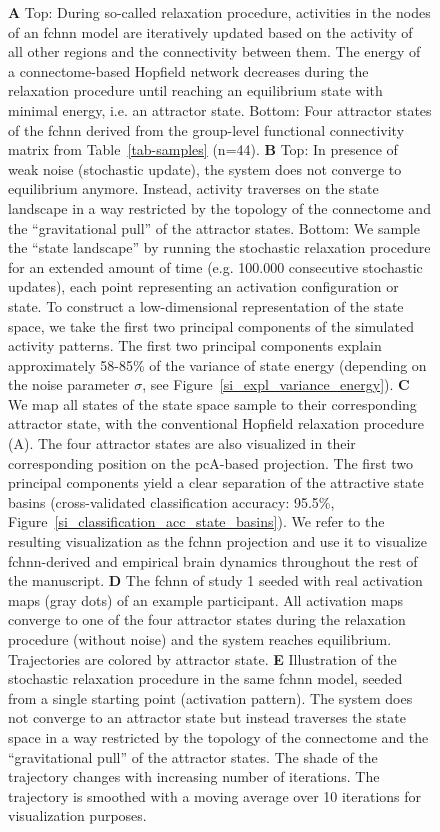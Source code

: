 \documentclass{article}
\begin{document}
\begin{figure}[!htbp]
{\textbf{A} Top: During so-called relaxation procedure, activities in the nodes of an \acrshort{fchnn} model are iteratively updated based on the activity of all other regions and the connectivity between them. The energy of a
connectome-based Hopfield network decreases during the relaxation procedure until reaching an equilibrium state with
minimal energy, i.e. an attractor state. Bottom: Four attractor states of the \acrshort{fchnn} derived from the
group-level functional connectivity matrix from Table~\ref{tab-samples} (n=44).
\textbf{B} Top: In presence of weak noise (stochastic update), the system
does not converge to equilibrium anymore. Instead, activity traverses on the state landscape in a way
restricted by the topology of the connectome and the ``gravitational pull'' of the attractor states. Bottom: We sample
the ``state landscape'' by running the stochastic relaxation procedure for an extended amount of time (e.g. 100.000 consecutive
stochastic updates), each point representing an activation configuration or state. To construct a
low-dimensional representation of the state space, we take the first two principal components of the simulated activity
patterns. The first two principal components explain approximately 58-85\% of the variance of state energy (depending
on the noise parameter $\sigma$, see Figure~\ref{si_expl_variance_energy}).
\textbf{C} We map all states of the state space sample to their corresponding attractor state, with the conventional
Hopfield relaxation procedure (A). The four attractor states are also visualized in their corresponding position on the
\acrshort{pc}A-based projection. The first two principal components yield a clear separation of the attractive state basins
(cross-validated classification accuracy: 95.5\%, Figure~\ref{si_classification_acc_state_basins}). We refer to the resulting visualization
as the \acrshort{fchnn} projection and use it to visualize \acrshort{fchnn}-derived and empirical brain dynamics throughout the rest of
the manuscript.
\textbf{D} The \acrshort{fchnn} of study 1 seeded with real activation maps (gray dots) of an example participant. All activation maps converge to one of the four attractor states during the relaxation procedure (without noise) and the system reaches equilibrium. Trajectories are colored by attractor state.
\textbf{E} Illustration of the stochastic relaxation procedure in the same \acrshort{fchnn} model, seeded from a single starting point (activation pattern). The system does not converge to an attractor state but instead traverses the state space in a way restricted by the topology of the connectome and the ``gravitational pull'' of the attractor states. The shade of the trajectory changes with increasing number of iterations. The trajectory is smoothed with a moving average over 10 iterations for visualization purposes.
}
\end{figure}
\end{document}
